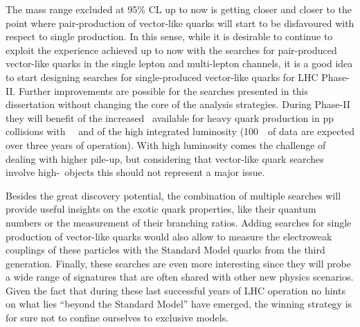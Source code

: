 The mass range excluded at 95\% CL up to now
is getting closer and closer to the point where pair-production
of vector-like quarks will start to be disfavoured with respect
to single production. In this sense, while it is desirable to continue to
exploit the experience achieved up to now with the searches for
pair-produced vector-like quarks in the single lepton and multi-lepton
channels, it is a good idea to start designing searches for
single-produced vector-like quarks for LHC Phase-II.
Further improvements are possible for the searches
presented in this dissertation without changing the core of
the analysis strategies. During Phase-II they will benefit
of the increased \cme\ available for heavy quark production
in pp collisions with ~\tev\ and of the high integrated
luminosity (100~\ifb\ of data are expected over three years
of operation). With high luminosity comes the challenge of
dealing with higher pile-up, but considering that vector-like
quark searches involve high-\pt\ objects this should not
represent a major issue.

Besides the great discovery potential, the combination
of multiple searches will provide useful insights on the
exotic quark properties, like their quantum numbers or
the measurement of their branching ratios. 
Adding searches for single production of vector-like quarks
would also allow to measure the electroweak couplings of
these particles with the Standard Model quarks from the third generation.
Finally, these searches are even more interesting since
they will probe a wide range of
signatures that are often shared with other new physics
scenarios. Given the fact that during these last successful years
of LHC operation no hints on what lies ``beyond the Standard Model''
have emerged, the winning strategy is for sure not to confine ourselves 
to exclusive models.
